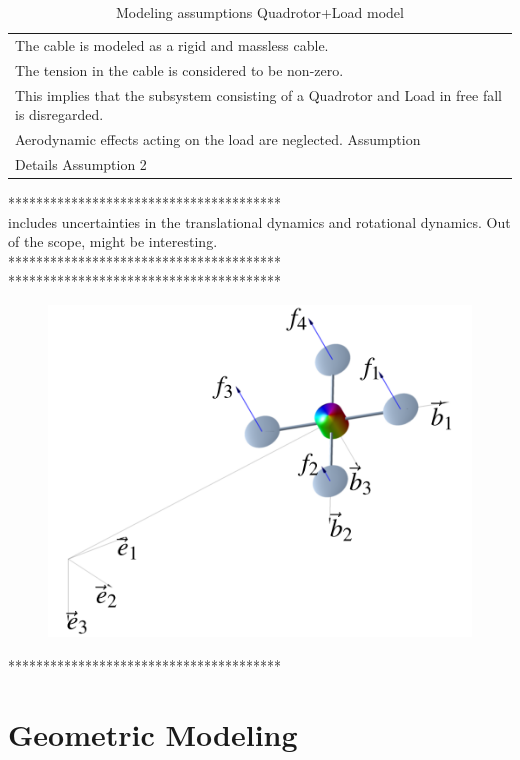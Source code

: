 \begin{table}[h!]
	\centering
	\begin{tabular}{|p{\textwidth}|}
		\hline
		\tabitem The cable is modeled as a rigid and massless cable. \\
		\tabitem The tension in the cable is considered to be non-zero.\\
		\hspace{4mm} This implies that the subsystem consisting of a Quadrotor and Load in free fall is disregarded.\\		 
		\tabitem Aerodynamic effects acting on the load are neglected.
		\tabitem Assumption \\
		\hspace{4mm} Details Assumption 2\\
		\hline
	\end{tabular}
	\caption{Modeling assumptions Quadrotor+Load model}
	\label{tab:mod.assumptionsQRL}
\end{table}



***************************************\\
\cite{Goodarzi2013a} includes uncertainties in the translational dynamics and rotational dynamics. Out of the scope, might be interesting.\\
***************************************\\


***************************************\\
\begin{figure}[h!]
	\centering
	\includegraphics[width=.45\textwidth]{./StyleStuff/LeeQRmodel.png}
	\caption{\label{fig:}}
\end{figure}		
***************************************\\


\section{Geometric Modeling}\label{sec:mod.geometric}

